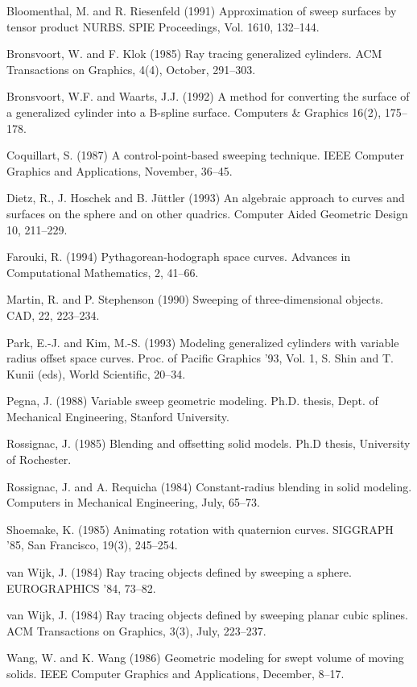 
\begin{thebibliography}{Shoemake 85}

Bloomenthal, M. and R. Riesenfeld (1991)
Approximation of sweep surfaces by tensor product NURBS.
SPIE Proceedings,
Vol. 1610, 132--144.

Bronsvoort, W. and F. Klok (1985)
Ray tracing generalized cylinders.
ACM Transactions on Graphics, 4(4), October, 291--303.

Bronsvoort, W.F. and Waarts, J.J. (1992)
A method for converting the surface of a generalized cylinder into
a B-spline surface.
Computers \& Graphics 16(2), 175--178.

Coquillart, S. (1987)
A control-point-based sweeping technique.
IEEE Computer Graphics and Applications, November, 36--45.

Dietz, R., J. Hoschek and B. J\"{u}ttler (1993)
An algebraic approach to curves and surfaces on the sphere and on other
quadrics.  Computer Aided Geometric Design 10, 211--229.

Farouki, R. (1994)
Pythagorean-hodograph space curves.
Advances in Computational Mathematics, 2, 41--66.

Martin, R. and P. Stephenson (1990)
Sweeping of three-dimensional objects.
CAD, 22, 223--234.

Park, E.-J. and Kim, M.-S. (1993)
Modeling generalized cylinders with variable radius offset space curves.
Proc. of Pacific Graphics '93, Vol. 1, S. Shin and T. Kunii (eds),
World Scientific, 20--34.

Pegna, J. (1988) Variable sweep geometric modeling.
Ph.D. thesis, Dept. of Mechanical Engineering, Stanford University.

Rossignac, J. (1985)
Blending and offsetting solid models.
Ph.D thesis, University of Rochester.

Rossignac, J. and A. Requicha (1984)
Constant-radius blending in solid modeling.
Computers in Mechanical Engineering, July, 65--73.

Shoemake, K. (1985) Animating rotation with quaternion curves.
SIGGRAPH '85, San Francisco, 19(3), 245--254.

van Wijk, J. (1984)
Ray tracing objects defined by sweeping a sphere.
EUROGRAPHICS '84, 73--82.

van Wijk, J. (1984)
Ray tracing objects defined by sweeping planar cubic splines.
ACM Transactions on Graphics, 3(3), July, 223--237.

Wang, W. and K. Wang (1986)
Geometric modeling for swept volume of moving solids.
IEEE Computer Graphics and Applications, December, 8--17.

\end{thebibliography}


